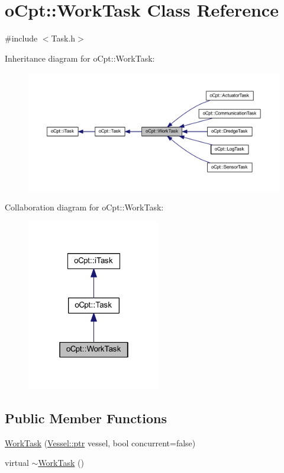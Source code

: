 \hypertarget{classo_cpt_1_1_work_task}{}\section{o\+Cpt\+:\+:Work\+Task Class Reference}
\label{classo_cpt_1_1_work_task}


{\ttfamily \#include $<$Task.\+h$>$}



Inheritance diagram for o\+Cpt\+:\+:Work\+Task\+:\nopagebreak
\begin{figure}[H]
\begin{center}
\leavevmode
\includegraphics[width=350pt]{classo_cpt_1_1_work_task__inherit__graph}
\end{center}
\end{figure}


Collaboration diagram for o\+Cpt\+:\+:Work\+Task\+:\nopagebreak
\begin{figure}[H]
\begin{center}
\leavevmode
\includegraphics[width=166pt]{classo_cpt_1_1_work_task__coll__graph}
\end{center}
\end{figure}
\subsection*{Public Member Functions}
\begin{DoxyCompactItemize}
\item 
\hyperlink{classo_cpt_1_1_work_task_acc13280a8c8cd8879b0a2ef2239943bb}{Work\+Task} (\hyperlink{classo_cpt_1_1i_vessel_a43711a596f3bdfd0ca732ed3901edc97}{Vessel\+::ptr} vessel, bool concurrent=false)
\item 
virtual \hyperlink{classo_cpt_1_1_work_task_a9158f1f64ab798531258775607377383}{$\sim$\+Work\+Task} ()
\end{DoxyCompactItemize}
